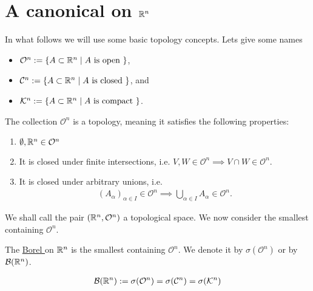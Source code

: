 \section{A canonical \siga on $\mathbb{R}^n$}

\newcommand{\OS}{\mathcal{O}}
\newcommand{\CS}{\mathcal{C}}
\newcommand{\KS}{\mathcal{K}}
In what follows we will use some basic topology concepts. Lets give some names
\begin{itemize}
	\item $\OS^n := \{A \subset \R^n \mid A \text{ is open }\}$,
	\item $\CS^n := \{A \subset \R^n \mid A \text{ is closed }\}$, and
	\item $\KS^n := \{A \subset \R^n \mid A \text{ is compact }\}$.
\end{itemize}

The collection $\OS^n$ is a topology, meaning it satisfies the following properties:
\begin{enumerate}
	\item $\emptyset, \R^n \in \OS^n$
	\item It is closed under finite intersections, i.e. $V, W \in \OS^n \implies V \cap W \in \OS^n$.
	\item It is closed under arbitrary unions, i.e.
	\begin{align*}
		(A_\alpha)_{\alpha \in I} \in \OS^n \implies \bigcup_{\alpha \in I} A_\alpha \in \OS^n.
	\end{align*}
\end{enumerate}

We shall call the pair $(\R^n, \OS^n)$ a topological space. We now consider the smallest \siga containing $\OS^n$.

\begin{dfn}
	The \underline{Borel \siga} on $\mathbb{R}^n$ is the smallest \siga containing $\OS^n$. We denote it by $\sigma(\OS^n)$ or by $\mathcal{B}(\mathbb{R}^n)$.
\end{dfn}

\begin{thm}
	\begin{align*}
		\borel(\R^n) := \sigma(\OS^n) = \sigma(\CS^n) = \sigma(\KS^n)
	\end{align*}
\end{thm}

